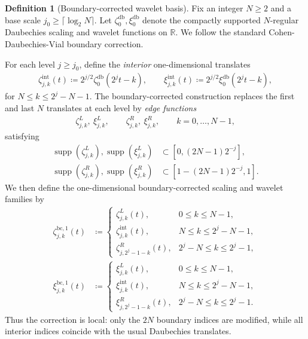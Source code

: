 \documentclass[11pt,reqno]{amsart}
\theoremstyle{definition}
\newtheorem{definition}{Definition}
\begin{document}
\begin{definition}[Boundary-corrected wavelet basis]
\label{def:bc_wavelet_basis}
Fix an integer $N\ge 2$ and a base scale $j_0\ge \lceil \log_2 N\rceil$. Let $\zeta_0^{\mathrm{db}},\xi_0^{\mathrm{db}}$ denote the compactly supported $N$-regular Daubechies scaling and wavelet functions on $\mathbb R$. We follow the standard Cohen-Daubechies-Vial boundary correction.

For each level $j\ge j_0$, define the \emph{interior} one-dimensional translates
\begin{align*}
    \zeta_{j,k}^{\mathrm{int}}(t) \coloneqq 2^{j/2}\zeta_0^{\mathrm{db}}(2^jt-k),
    \qquad
    \xi_{j,k}^{\mathrm{int}}(t) \coloneqq 2^{j/2}\xi_0^{\mathrm{db}}(2^jt-k),
\end{align*}
for $N\le k\le 2^j-N-1$. The boundary-corrected construction replaces the first and last $N$ translates at each level by \emph{edge functions}
\begin{align*}
    \zeta_{j,k}^{L},\ \xi_{j,k}^{L},
    \qquad
    \zeta_{j,k}^{R},\ \xi_{j,k}^{R},
    \qquad k=0,\ldots,N-1,
\end{align*}
satisfying
\begin{align*}
    \operatorname{supp}(\zeta_{j,k}^{L}),\operatorname{supp}(\xi_{j,k}^{L})
    &\subset [0,(2N-1)2^{-j}],\\
    \operatorname{supp}(\zeta_{j,k}^{R}),\operatorname{supp}(\xi_{j,k}^{R})
    &\subset [1-(2N-1)2^{-j},1].
\end{align*}
We then define the one-dimensional boundary-corrected scaling and wavelet families by
\begin{align}
    \zeta_{j,k}^{\mathrm{bc},1}(t)
    &\coloneqq
    \begin{cases}
        \zeta_{j,k}^{L}(t), & 0\le k\le N-1,\\
        \zeta_{j,k}^{\mathrm{int}}(t), & N\le k\le 2^j-N-1,\\
        \zeta_{j,2^j-1-k}^{R}(t), & 2^j-N\le k\le 2^j-1,
    \end{cases}\\
    \xi_{j,k}^{\mathrm{bc},1}(t)
    &\coloneqq
    \begin{cases}
        \xi_{j,k}^{L}(t), & 0\le k\le N-1,\\
        \xi_{j,k}^{\mathrm{int}}(t), & N\le k\le 2^j-N-1,\\
        \xi_{j,2^j-1-k}^{R}(t), & 2^j-N\le k\le 2^j-1.
    \end{cases}
\end{align}
Thus the correction is local: only the $2N$ boundary indices are modified, while all interior indices coincide with the usual Daubechies translates.


\end{definition}
\end{document}
